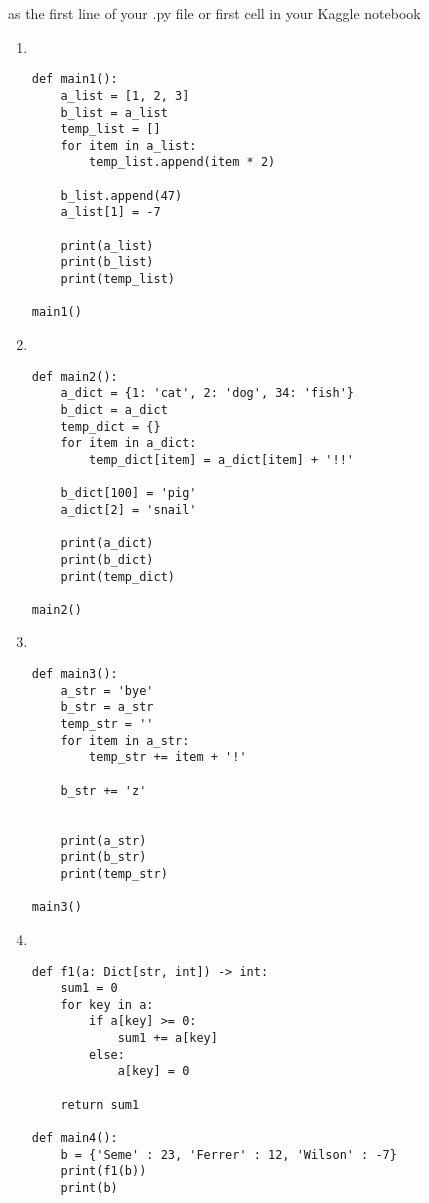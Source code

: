 \documentclass{article}
\begin{document}
as the first line of your .py file or first cell in your Kaggle notebook



\begin{enumerate}

\item  \

\begin{verbatim}
def main1():
    a_list = [1, 2, 3]
    b_list = a_list
    temp_list = []
    for item in a_list:
        temp_list.append(item * 2)

    b_list.append(47)
    a_list[1] = -7

    print(a_list)
    print(b_list)
    print(temp_list)

main1()
\end{verbatim}
\newpage

\item  \

\begin{verbatim}
def main2():
    a_dict = {1: 'cat', 2: 'dog', 34: 'fish'}
    b_dict = a_dict
    temp_dict = {}
    for item in a_dict:
        temp_dict[item] = a_dict[item] + '!!'

    b_dict[100] = 'pig'
    a_dict[2] = 'snail'

    print(a_dict)
    print(b_dict)
    print(temp_dict)

main2()
\end{verbatim}
\vfill

\item \
\begin{verbatim}
def main3():
    a_str = 'bye'
    b_str = a_str
    temp_str = ''
    for item in a_str:
        temp_str += item + '!'

    b_str += 'z'


    print(a_str)
    print(b_str)
    print(temp_str)

main3()
\end{verbatim}
\vfill
\vfill
\newpage

\item \

\begin{verbatim}
def f1(a: Dict[str, int]) -> int:
    sum1 = 0
    for key in a:
        if a[key] >= 0:
            sum1 += a[key]
        else:
            a[key] = 0

    return sum1

def main4():
    b = {'Seme' : 23, 'Ferrer' : 12, 'Wilson' : -7}
    print(f1(b))
    print(b)


\end{verbatim}
\end{enumerate}
\end{document}
